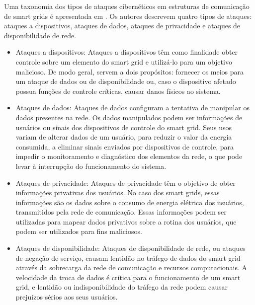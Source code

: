\documentclass[cic,tc]{iiufrgs}
\begin{document}
Uma taxonomia dos tipos de ataques cibernéticos em estruturas de comunicação de smart grids é apresentada em \cite{li2012securing}. Os autores descrevem quatro tipos de ataques: ataques a dispositivos, ataques de dados, ataques de privacidade e ataques de disponibilidade de rede.

\begin{itemize}
\item{Ataques a dispositivos}: Ataques a dispositivos têm como finalidade obter controle sobre um elemento do smart grid e utilizá-lo para um objetivo malicioso. De modo geral, servem a dois propósitos: fornecer os meios para um ataque de dados ou de disponibilidade ou, caso o dispositivo afetado possua funções de controle críticas, causar danos físicos ao sistema.
\item{Ataques de dados}: Ataques de dados configuram a tentativa de manipular os dados presentes na rede. Os dados manipulados podem ser informações de usuários ou sinais dos dispositivos de controle do smart grid. Seus usos variam de alterar dados de um usuário, para reduzir o valor da energia consumida, a eliminar sinais enviados por dispositivos de controle, para impedir o monitoramento e diagnóstico dos elementos da rede, o que pode levar à interrupção do funcionamento do sistema.
\item{Ataques de privacidade}: Ataques de privacidade têm o objetivo de obter informações privativas dos usuários. No caso dos smart grids, essas informações são os dados sobre o consumo de energia elétrica dos usuários, transmitidos pela rede de comunicação. Essas informações podem ser utilizadas para mapear dados privativos sobre a rotina dos usuários, que podem ser utilizados para fins maliciosos.
\item{Ataques de disponibilidade}: Ataques de disponibilidade de rede, ou ataques de negação de serviço, causam lentidão no tráfego de dados do smart grid através da sobrecarga da rede de comunicação e recursos computacionais. A velocidade da troca de dados é crítica para o funcionamento de um smart grid, e lentidão ou indisponibilidade do tráfego da rede podem causar prejuízos sérios aos seus usuários.
\end{itemize}
\end{document}
